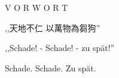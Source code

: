 \documentclass[12pt]{article}
\begin{document}
\begingroup
\begin{center}
\end{center}
\endgroup

\vspace{3\baselineskip}

\begingroup
\begin{center}
\huge V O R W O R T
\end{center}
\endgroup

\vspace{8\baselineskip}

\begingroup
\begin{center}
{\setmainfont{Source Han Serif SC}\selectfont ,,天地不仁 以萬物為芻狗'' }
\end{center}
\endgroup

\begingroup
\begin{center}
,,Schade! - Schade! - zu spät!'' 
\end{center}
\endgroup

\begingroup
\begin{center}
Schade. Schade. Zu spät.
\end{center}
\endgroup
\end{document}
